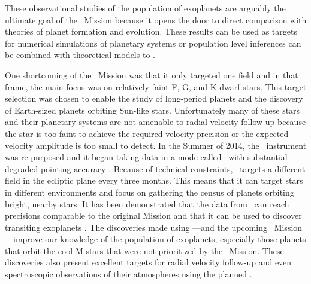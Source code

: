 These observational studies of the population of exoplanets are arguably the
ultimate goal of the \kepler\ Mission because it opens the door to direct
comparison with theories of planet formation and evolution.
These results can be used as targets for numerical simulations of planetary
systems or population level inferences can be combined with theoretical models
to \citep{Wolfgang:2014, Rogers:2015}.

One shortcoming of the \kepler\ Mission was that it only targeted one field
and in that frame, the main focus was on relatively faint F, G, and K dwarf
stars.
This target selection was chosen to enable the study of long-period planets
and the discovery of Earth-sized planets orbiting Sun-like stars.
Unfortunately many of these stars and their planetary systems are not amenable
to radial velocity follow-up because the star is too faint to achieve the
required velocity precision or the expected velocity amplitude is too small to
detect.
In the Summer of 2014, the \kepler\ instrument was re-purposed and it began
taking data in a mode called \KT\ with substantial degraded pointing accuracy
\citep{Howell:2014}.
Because of technical constraints, \KT\ targets a different field in the
ecliptic plane every three months.
This means that it can target stars in different environments and focus on
gathering the census of planets orbiting bright, nearby stars.
It has been demonstrated that the data from \KT\ can reach precisions
comparable to the original Mission and that it can be used to discover
transiting exoplanets \citep[][and ]{Vanderburg:2014,
Vanderburg:2015, Crossfield:2015, Foreman-Mackey:2015}.
The discoveries made using \KT---and the upcoming \tess\ Mission---improve our
knowledge of the population of exoplanets, especially those planets that orbit
the cool M-stars that were not prioritized by the \kepler\ Mission.
These discoveries also present excellent targets for radial velocity follow-up
and even spectroscopic observations of their atmospheres using the planned
.


